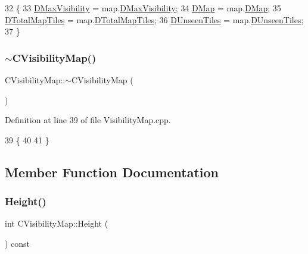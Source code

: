 \begin{DoxyCode}
32                                                        \{
33     \hyperlink{classCVisibilityMap_ac8f71b9541c903fce0294d75daa1bbb1}{DMaxVisibility} = map.\hyperlink{classCVisibilityMap_ac8f71b9541c903fce0294d75daa1bbb1}{DMaxVisibility};
34     \hyperlink{classCVisibilityMap_ad217bc34f7a50dd357a3eeeb69cfdd85}{DMap} = map.\hyperlink{classCVisibilityMap_ad217bc34f7a50dd357a3eeeb69cfdd85}{DMap};
35     \hyperlink{classCVisibilityMap_a9bd6e633268535677aeefbd886c29485}{DTotalMapTiles} = map.\hyperlink{classCVisibilityMap_a9bd6e633268535677aeefbd886c29485}{DTotalMapTiles};
36     \hyperlink{classCVisibilityMap_a117ff39fef73ffd4cc4ba35c35e63171}{DUnseenTiles} = map.\hyperlink{classCVisibilityMap_a117ff39fef73ffd4cc4ba35c35e63171}{DUnseenTiles};
37 \}
\end{DoxyCode}
\hypertarget{classCVisibilityMap_abaf8bf7d8db8877d51e5691de87ef672}{}\label{classCVisibilityMap_abaf8bf7d8db8877d51e5691de87ef672} 
\subsubsection{\texorpdfstring{$\sim$\+C\+Visibility\+Map()}{~CVisibilityMap()}}
{\footnotesize\ttfamily C\+Visibility\+Map\+::$\sim$\+C\+Visibility\+Map (\begin{DoxyParamCaption}{ }\end{DoxyParamCaption})}



Definition at line 39 of file Visibility\+Map.\+cpp.


\begin{DoxyCode}
39                                \{
40     
41 \}
\end{DoxyCode}


\subsection{Member Function Documentation}
\hypertarget{classCVisibilityMap_a19c9135268d93be11a13e108a87414ea}{}\label{classCVisibilityMap_a19c9135268d93be11a13e108a87414ea} 
\subsubsection{\texorpdfstring{Height()}{Height()}}
{\footnotesize\ttfamily int C\+Visibility\+Map\+::\+Height (\begin{DoxyParamCaption}{ }\end{DoxyParamCaption}) const}



